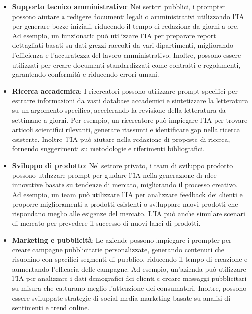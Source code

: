             \begin{itemize}
                \item \textbf{Supporto tecnico amministrativo}: Nei settori pubblici, i prompter possono aiutare a redigere documenti legali o amministrativi utilizzando l'IA per generare bozze iniziali, riducendo il tempo di redazione da giorni a ore. Ad esempio, un funzionario può utilizzare l'IA per preparare report dettagliati basati su dati grezzi raccolti da vari dipartimenti, migliorando l'efficienza e l'accuratezza del lavoro amministrativo. Inoltre, possono essere utilizzati per creare documenti standardizzati come contratti e regolamenti, garantendo conformità e riducendo errori umani.
                
                \item \textbf{Ricerca accademica}: I ricercatori possono utilizzare prompt specifici per estrarre informazioni da vasti database accademici e sintetizzare la letteratura su un argomento specifico, accelerando la revisione della letteratura da settimane a giorni. Per esempio, un ricercatore può impiegare l'IA per trovare articoli scientifici rilevanti, generare riassunti e identificare gap nella ricerca esistente. Inoltre, l'IA può aiutare nella redazione di proposte di ricerca, fornendo suggerimenti su metodologie e riferimenti bibliografici.
                
                \item \textbf{Sviluppo di prodotto}: Nel settore privato, i team di sviluppo prodotto possono utilizzare prompt per guidare l'IA nella generazione di idee innovative basate su tendenze di mercato, migliorando il processo creativo. Ad esempio, un team può utilizzare l'IA per analizzare feedback dei clienti e proporre miglioramenti a prodotti esistenti o sviluppare nuovi prodotti che rispondano meglio alle esigenze del mercato. L'IA può anche simulare scenari di mercato per prevedere il successo di nuovi lanci di prodotti.
                
                \item \textbf{Marketing e pubblicità}: Le aziende possono impiegare i prompter per creare campagne pubblicitarie personalizzate, generando contenuti che risuonino con specifici segmenti di pubblico, riducendo il tempo di creazione e aumentando l'efficacia delle campagne. Ad esempio, un'azienda può utilizzare l'IA per analizzare i dati demografici dei clienti e creare messaggi pubblicitari su misura che catturano meglio l'attenzione dei consumatori. Inoltre, possono essere sviluppate strategie di social media marketing basate su analisi di sentimenti e trend online.
                

\end{itemize}

